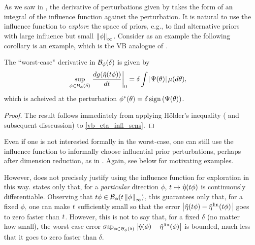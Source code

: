 As we saw in , the derivative of perturbations given
by  takes the form of an integral of the influence
function against the perturbation.  It is natural to use the influence function
to {\em explore} the space of priors, e.g., to find alternative priors with
large influence but small $\left\Vert\phi\right\Vert_{\infty}$.  Consider as an example the
following corollary is an example, which is the VB analogue of \citet[Result
11]{gustafson:1996:local}.


\begin{cor}
%
The ``worst-case'' derivative in $\mathcal{B}_\phi(\delta)$ is given by
%
\begin{align*}
%
\sup_{\phi \in \ball_\phi(\delta)}
    \fracat{d g(\etaopt(\t \phi))}{d \t}{0} =
        \delta \int \abs{\infl(\theta)} \mu(d\theta),
%
\end{align*}
%
which is acheived at the perturbation
$\phi^*(\theta) = \delta \, \mathrm{sign}\left(\Psi(\theta)\right)$.
%
\begin{proof}
%
The result follows immediately from applying H{\"o}lder's inequality
(\citet[Theorem 5.1.2]{dudley:2018:real} and subsequent disscussion)
to \eqref{vb_eta_infl_sens}.
%
\end{proof}
%
\end{cor}


Even if one is not interested formally in the worst-case, one can still use the
influence function to informally choose influential prior perturbations, perhaps
after dimension reduction, as in .  Again, see
 below for motivating examples.

However,  does not precisely justify using the
influence function for exploration in this way.  
states only that, for a {\em particular} direction $\phi$, $t \mapsto
\hat\eta(t \phi)$ is continuously differentiable.  Observing that $t \phi \in
\mathcal{B}_\phi(t \left\Vert\phi\right\Vert_{\infty})$, this guarantees only that, for a fixed $\phi$,
one can make $t$ sufficiently small so that the error $\left|\hat\eta(t \phi) -
\hat\eta^{\mathrm{lin}}(t \phi)\right|$ goes to zero faster than $t$. However, this is not to say
that, for a fixed $\delta$ (no matter how small), the worst-case error
$\sup_{\phi \in \mathcal{B}_\phi(\delta)} \left|\hat\eta(\phi) - \hat\eta^{\mathrm{lin}}(\phi)\right|$ is
bounded, much less that it goes to zero faster than $\delta$.

